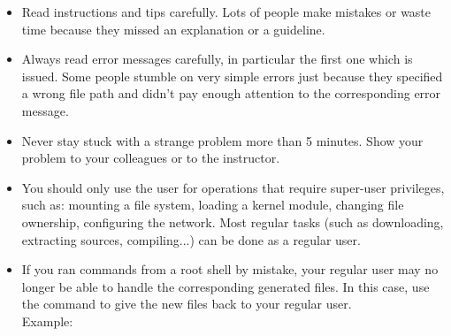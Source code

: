 \begin{itemize}

\item Read instructions and tips carefully. Lots of people make
  mistakes or waste time because they missed an explanation or a
  guideline.

\item Always read error messages carefully, in particular the first
  one which is issued. Some people stumble on very simple errors just
  because they specified a wrong file path and didn't pay enough
  attention to the corresponding error message.

\item Never stay stuck with a strange problem more than 5
  minutes. Show your problem to your colleagues or to the instructor.

\item You should only use the  user for operations that require
  super-user privileges, such as: mounting a file system, loading a
  kernel module, changing file ownership, configuring the
  network. Most regular tasks (such as downloading, extracting
  sources, compiling...) can be done as a regular user.

\item If you ran commands from a root shell by mistake, your regular
  user may no longer be able to handle the corresponding generated
  files. In this case, use the  command to give the new
  files back to your regular user.\\
  Example: 

\end{itemize}

